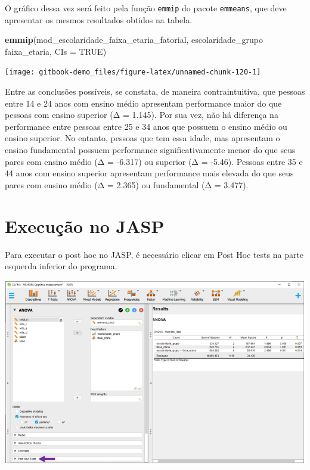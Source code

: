 \documentclass[
]{book}
\newenvironment{Shaded}{\begin{snugshade}}{\end{snugshade}}
\newcommand{\DataTypeTok}[1]{\textcolor[rgb]{0.13,0.29,0.53}{#1}}
\newcommand{\KeywordTok}[1]{\textcolor[rgb]{0.13,0.29,0.53}{\textbf{#1}}}
\newcommand{\NormalTok}[1]{#1}
\newcommand{\OperatorTok}[1]{\textcolor[rgb]{0.81,0.36,0.00}{\textbf{#1}}}
\newcommand{\OtherTok}[1]{\textcolor[rgb]{0.56,0.35,0.01}{#1}}
\newcommand{\StringTok}[1]{\textcolor[rgb]{0.31,0.60,0.02}{#1}}
\begin{document}
O gráfico dessa vez será feito pela função \texttt{emmip} do pacote \texttt{emmeans}, que deve apresentar os mesmos resultados obtidos na tabela.

\begin{Shaded}
\begin{Highlighting}[]
\KeywordTok{emmip}\NormalTok{(mod_escolaridade_faixa_etaria_fatorial, }
\NormalTok{      escolaridade_grupo }\OperatorTok{~}\StringTok{ }\NormalTok{faixa_etaria, }\DataTypeTok{CIs =} \OtherTok{TRUE}\NormalTok{)}
\end{Highlighting}
\end{Shaded}

\begin{center}\texttt{[image: gitbook-demo\_files/figure-latex/unnamed-chunk-120-1]} \end{center}

Entre as conclusões possíveis, se constata, de maneira contraintuitiva, que pessoas entre 14 e 24 anos com ensino médio apresentam performance maior do que pessoas com ensino superior (Δ = 1.145). Por sua vez, não há diferença na performance entre pessoas entre 25 e 34 anos que possuem o ensino médio ou ensino superior. No entanto, pessoas que tem essa idade, mas apresentam o ensino fundamental possuem performance significativamente menor do que seus pares com ensino médio (Δ = -6.317) ou superior (Δ = -5.46). Pessoas entre 35 e 44 anos com ensino superior apresentam performance mais elevada do que seus pares com ensino médio (Δ = 2.365) ou fundamental (Δ = 3.477).

\hypertarget{execuuxe7uxe3o-no-jasp-11}{%
\section{Execução no JASP}\label{execuuxe7uxe3o-no-jasp-11}}

Para executar o post hoc no JASP, é necessário clicar em Post Hoc tests na parte esquerda inferior do programa.

\includegraphics{./img/cap_anova_fatorial_posthoc.png}
\end{document}

